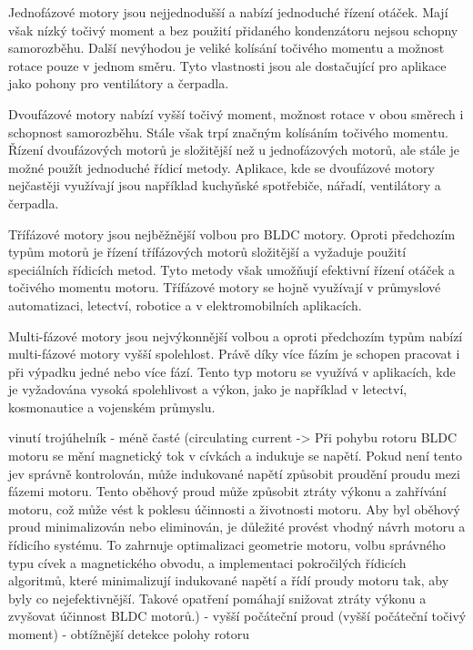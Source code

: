 Jednofázové motory jsou nejjednodušší a nabízí jednoduché řízení otáček. 
Mají však nízký točivý moment a bez použití přidaného kondenzátoru nejsou 
schopny samorozběhu. Další nevýhodou je veliké kolísání točivého momentu 
a možnost rotace pouze v jednom směru. Tyto vlastnosti jsou ale 
dostačující pro aplikace jako pohony pro ventilátory a čerpadla.

Dvoufázové motory nabízí vyšší točivý moment, možnost rotace v obou směrech i schopnost
samorozběhu. Stále však trpí značným kolísáním točivého momentu. Řízení dvoufázových motorů 
je složitější než u jednofázových motorů, ale stále je možné použít jednoduché řídicí metody.
Aplikace, kde se dvoufázové motory nejčastěji využívají jsou například kuchyňské spotřebiče, 
nářadí, ventilátory a čerpadla. 

Třífázové motory jsou nejběžnější volbou pro BLDC motory. 
Oproti předchozím typům motorů je řízení třífázových motorů složitější a vyžaduje
použití speciálních řídicích metod. Tyto metody však umožňují efektivní řízení otáček a točivého momentu motoru.
Třífázové motory se hojně využívají v průmyslové automatizaci, letectví, robotice a v elektromobilních aplikacích. 

Multi-fázové motory jsou nejvýkonnější volbou a oproti předchozím typům nabízí multi-fázové motory vyšší spolehlost. 
Právě díky více fázím je schopen pracovat i při výpadku jedné nebo více fází. 
Tento typ motoru se využívá v aplikacích, kde je vyžadována vysoká spolehlivost a výkon, jako
je například v letectví, kosmonautice a vojenském průmyslu.  

\secc vinutí trojúhelník
- méně časté (circulating current -> Při pohybu rotoru BLDC motoru se mění magnetický tok v cívkách a indukuje se napětí. Pokud není tento jev správně kontrolován, může indukované napětí způsobit proudění proudu mezi fázemi motoru. Tento oběhový proud může způsobit ztráty výkonu a zahřívání motoru, což může vést k poklesu účinnosti a životnosti motoru. Aby byl oběhový proud minimalizován nebo eliminován, je důležité provést vhodný návrh motoru a řídicího systému. To zahrnuje optimalizaci geometrie motoru, volbu správného typu cívek a magnetického obvodu, a implementaci pokročilých řídicích algoritmů, které minimalizují indukované napětí a řídí proudy motoru tak, aby byly co nejefektivnější. Takové opatření pomáhají snižovat ztráty výkonu a zvyšovat účinnost BLDC motorů.)
- vyšší počáteční proud (vyšší počáteční točivý moment)
- obtížnější detekce polohy rotoru 

